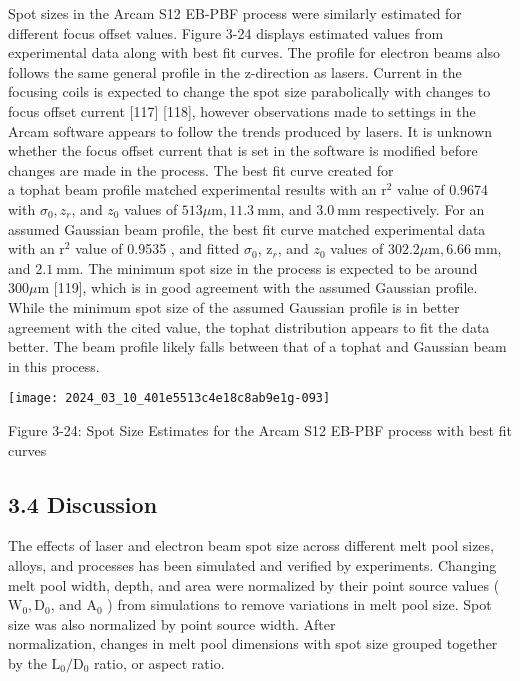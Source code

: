 \documentclass[10pt]{article}
\begin{document}
Spot sizes in the Arcam S12 EB-PBF process were similarly estimated for different focus offset values. Figure 3-24 displays estimated values from experimental data along with best fit curves. The profile for electron beams also follows the same general profile in the z-direction as lasers. Current in the focusing coils is expected to change the spot size parabolically with changes to focus offset current [117] [118], however observations made to settings in the Arcam software appears to follow the trends produced by lasers. It is unknown whether the focus offset current that is set in the software is modified before changes are made in the process. The best fit curve created for\\
a tophat beam profile matched experimental results with an $\mathrm{r}^{2}$ value of 0.9674 with $\sigma_{0}, z_{r}$, and $z_{0}$ values of $513 \mu \mathrm{m}, 11.3 \mathrm{~mm}$, and $3.0 \mathrm{~mm}$ respectively. For an assumed Gaussian beam profile, the best fit curve matched experimental data with an $\mathrm{r}^{2}$ value of 0.9535 , and fitted $\sigma_{0}$, $\mathrm{z}_{r}$, and $z_{0}$ values of $302.2 \mu \mathrm{m}, 6.66 \mathrm{~mm}$, and $2.1 \mathrm{~mm}$. The minimum spot size in the process is expected to be around $300 \mu \mathrm{m}$ [119], which is in good agreement with the assumed Gaussian profile. While the minimum spot size of the assumed Gaussian profile is in better agreement with the cited value, the tophat distribution appears to fit the data better. The beam profile likely falls between that of a tophat and Gaussian beam in this process.

\begin{center}
\texttt{[image: 2024\_03\_10\_401e5513c4e18c8ab9e1g-093]}
\end{center}

Figure 3-24: Spot Size Estimates for the Arcam S12 EB-PBF process with best fit curves

\subsection*{3.4 Discussion}
The effects of laser and electron beam spot size across different melt pool sizes, alloys, and processes has been simulated and verified by experiments. Changing melt pool width, depth, and area were normalized by their point source values ( $\mathrm{W}_{0}, \mathrm{D}_{0}$, and $\mathrm{A}_{0}$ ) from simulations to remove variations in melt pool size. Spot size was also normalized by point source width. After\\
normalization, changes in melt pool dimensions with spot size grouped together by the $\mathrm{L}_{0} / \mathrm{D}_{0}$ ratio, or aspect ratio.
\end{document}
